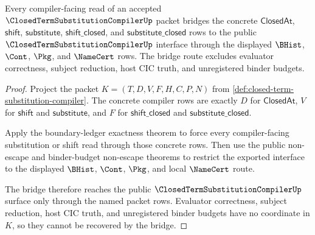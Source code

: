 \begin{theorem}
\label{thm:closed-term-substitution-compiler-bridge-route}
Every compiler-facing read of an accepted $\ClosedTermSubstitutionCompilerUp$ packet bridges the concrete $\mathsf{ClosedAt}$, $\mathsf{shift}$, $\mathsf{substitute}$, $\mathsf{shift\_closed}$, and $\mathsf{substitute\_closed}$ rows to the public $\ClosedTermSubstitutionCompilerUp$ interface through the displayed $\BHist$, $\Cont$, $\Pkg$, and $\NameCert$ rows. The bridge route excludes evaluator correctness, subject reduction, host CIC truth, and unregistered binder budgets.
\end{theorem}
\begin{proof}
Project the packet $K=(T,D,V,F,H,C,P,N)$ from \autoref{def:closed-term-substitution-compiler}. The concrete compiler rows are exactly $D$ for $\mathsf{ClosedAt}$, $V$ for $\mathsf{shift}$ and $\mathsf{substitute}$, and $F$ for $\mathsf{shift\_closed}$ and $\mathsf{substitute\_closed}$.

Apply the boundary-ledger exactness theorem to force every compiler-facing substitution or shift read through those concrete rows. Then use the public non-escape and binder-budget non-escape theorems to restrict the exported interface to the displayed $\BHist$, $\Cont$, $\Pkg$, and local $\NameCert$ route.

The bridge therefore reaches the public $\ClosedTermSubstitutionCompilerUp$ surface only through the named packet rows. Evaluator correctness, subject reduction, host CIC truth, and unregistered binder budgets have no coordinate in $K$, so they cannot be recovered by the bridge.
\end{proof}

